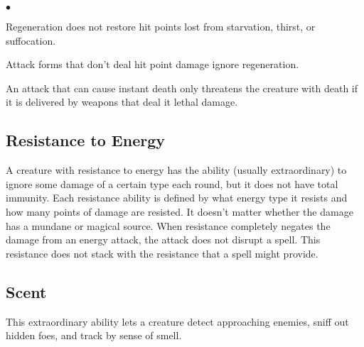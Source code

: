 \begin{list}{$\bullet$}{\itemspace}
	\item Regeneration does not restore hit points lost from starvation, thirst, or suffocation.
	\item Attack forms that don't deal hit point damage ignore regeneration.
	\item An attack that can cause instant death only threatens the creature with death if it is delivered by weapons that deal it lethal damage.
\end{list}

\subsection{Resistance to Energy}

A creature with resistance to energy has the ability (usually extraordinary) to ignore some damage of a certain type each round, but it does not have total immunity. Each resistance ability is defined by what energy type it resists and how many points of damage are resisted. It doesn't matter whether the damage has a mundane or magical source. When resistance completely negates the damage from an energy attack, the attack does not disrupt a spell. This resistance does not stack with the resistance that a spell might provide.

\subsection{Scent}

This extraordinary ability lets a creature detect approaching enemies, sniff out hidden foes, and track by sense of smell.

